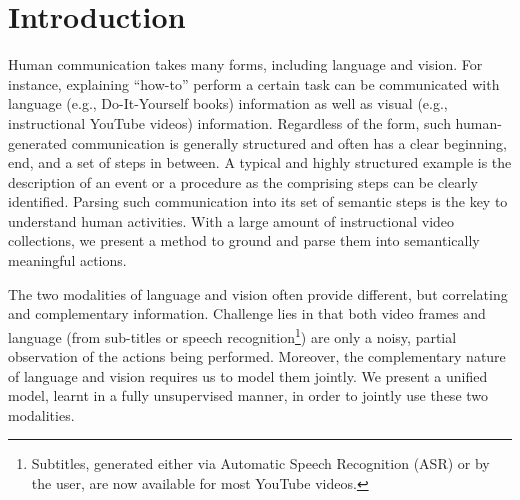 
\section{Introduction}
Human communication takes many forms, including language and vision. For instance, explaining ``how-to'' perform a certain task can be communicated with language (e.g., Do-It-Yourself books) information as well as visual (e.g., instructional YouTube videos) information. Regardless of the form, such human-generated communication is generally structured and often has a clear beginning, end, and a set of steps in between. A typical and highly structured example is the description of an event or a procedure as the comprising steps can be clearly identified. Parsing such communication into its set of semantic steps is the key to understand human activities. With a large amount of instructional video collections, we present a method to ground and parse them into semantically meaningful actions.



%
The two modalities of language and vision often provide different, but correlating and complementary information. Challenge lies in that both video frames and language (from sub-titles or speech recognition\footnote{Subtitles, generated either via Automatic Speech Recognition (ASR) or by the user, are now available for most YouTube videos.}) are only a noisy, partial observation of the actions being performed. Moreover, the complementary nature of language and vision requires us to model them jointly. We present a unified model, learnt in a fully unsupervised manner, in order to jointly use these two modalities.




